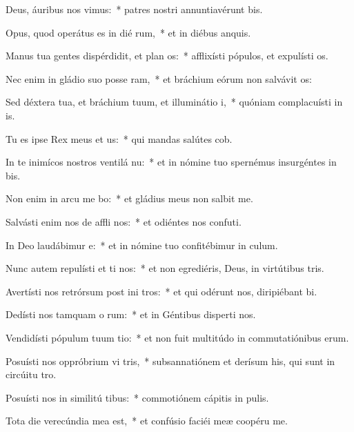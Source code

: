\item Deus, áuribus nos vimus:~* patres nostri annuntiavérunt bis.
\item Opus, quod operátus es in dié rum,~* et in diébus anquis.
\item Manus tua gentes dispérdidit, et plan os:~* afflixísti pópulos, et expulísti os.
\item Nec enim in gládio suo posse ram,~* et bráchium eórum non salvávit os:
\item Sed déxtera tua, et bráchium tuum, et illuminátio  i,~* quóniam complacuísti in is.
\item Tu es ipse Rex meus et  us:~* qui mandas salútes cob.
\item In te inimícos nostros ventilá nu:~* et in nómine tuo spernémus insurgéntes in bis.
\item Non enim in arcu me bo:~* et gládius meus non salbit me.
\item Salvásti enim nos de affli nos:~* et odiéntes nos confuti.
\item In Deo laudábimur  e:~* et in nómine tuo confitébimur in culum.
\item Nunc autem repulísti et ti nos:~* et non egrediéris, Deus, in virtútibus tris.
\item Avertísti nos retrórsum post ini tros:~* et qui odérunt nos, diripiébant bi.
\item Dedísti nos tamquam o rum:~* et in Géntibus disperti nos.
\item Vendidísti pópulum tuum  tio:~* et non fuit multitúdo in commutatiónibus erum.
\item Posuísti nos oppróbrium vi tris,~* subsannatiónem et derísum his, qui sunt in circúitu tro.
\item Posuísti nos in similitú tibus:~* commotiónem cápitis in pulis.
\item Tota die verecúndia mea   est,~* et confúsio faciéi meæ coopéru me.
